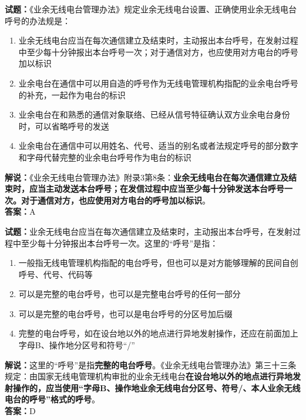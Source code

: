 \documentclass{ctexbook}
\begin{document}
\vspace{1em}

\textbf{试题：}《业余无线电台管理办法》规定业余无线电台设置、正确使用业余无线电台呼号的办法规是：
\begin{enumerate}[leftmargin=3em]
  \item 业余无线电台应当在每次通信建立及结束时，主动报出本台呼号，在发射过程中至少每十分钟报出本台呼号一次；对于通信对方，也应使用对方电台的呼号加以标识
  \item 业余电台在通信中可以用自造的呼号作为无线电管理机构指配的业余电台呼号的补充，一起作为电台的标识
  \item 业余电台在和熟悉的通信对象联络、已经从信号特征确认双方业余电台身份时，可以省略呼号的发送
  \item 业余电台在通信中可以用姓名、代号、适当的别名或者法规定呼号的部分数字和字母代替完整的业余电台呼号作为电台的标识
\end{enumerate}
\noindent\textbf{解说：}《业余无线电台管理办法》附录3第8条：\textbf{业余无线电台在每次通信建立及结束时，应当主动发送本台呼号；在发信过程中应当至少每十分钟发送本台呼号一次。对于通信对方，也应使用对方电台的呼号加以标识}。\\\noindent\textbf{答案：}A

\vspace{1em}

\textbf{试题：}业余无线电台应当在每次通信建立及结束时，主动报出本台呼号，在发射过程中至少每十分钟报出本台呼号一次。这里的“呼号”是指：
\begin{enumerate}[leftmargin=3em]
  \item 一般指无线电管理机构指配的电台呼号，但也可以是对方能够理解的民间自创呼号、代号、代码等
  \item 可以是完整的电台呼号，也可以是完整电台呼号的任何一部分
  \item 可以是完整的电台呼号，也可以是电台呼号的分区号加后缀
  \item 完整的电台呼号，如在设台地以外的地点进行异地发射操作，还应在前面加上字母B、操作地分区号和符号“/”
\end{enumerate}
\noindent\textbf{解说：}这里的“呼号”是指\textbf{完整的电台呼号}。《业余无线电台管理办法》第三十三条规定：由国家无线电管理机构审批的业余无线电台\textbf{在设台地以外的地点进行异地发射操作的，应当使用“字母B、操作地业余无线电台分区号、符号/、本人业余无线电台的呼号”格式的呼号}。\\\noindent\textbf{答案：}D

\vspace{1em}
\end{document}
